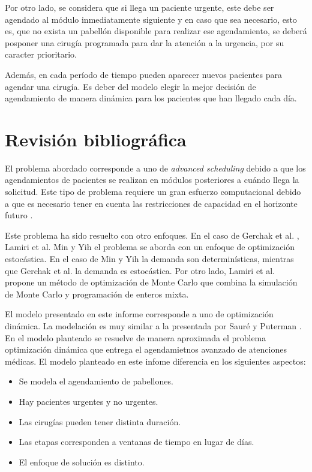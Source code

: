 \documentclass[letterpaper,10pt]{article}
\begin{document}
Por otro lado, se considera que si llega un paciente urgente, este debe ser agendado al módulo inmediatamente siguiente y en caso que sea necesario, esto es, que no exista un pabellón disponible para realizar ese agendamiento, se deberá posponer una cirugía programada para dar la atención a la urgencia, por su caracter prioritario.


Además, en cada período de tiempo pueden aparecer nuevos pacientes para agendar una cirugía. Es deber del modelo elegir la mejor decisión de agendamiento de manera dinámica para los pacientes que han llegado cada día.

\section*{Revisión bibliográfica}

El problema abordado corresponde a uno de 
\textit{advanced scheduling} debido a que los agendamientos de pacientes se realizan en módulos posteriores a cuándo llega la solicitud. Este tipo de problema requiere un gran esfuerzo computacional debido a que es necesario tener en cuenta las restricciones de capacidad en el horizonte futuro \cite{Yasin}.

Este problema ha sido resuelto con otro enfoques. En el caso de Gerchak et al. \cite{Gerchak}, Lamiri et al. \cite{Lamiri} Min y Yih \cite{Min} el problema se aborda con un enfoque de optimización estocástica. En el caso de Min y Yih \cite{Min} la demanda son determinísticas, mientras que Gerchak et al. la demanda es estocástica. Por otro lado, Lamiri et al. propone un método de optimización de Monte Carlo que combina la simulación de Monte Carlo y programación de enteros mixta. 

El modelo presentado en este informe corresponde a uno de optimización dinámica. La modelación es muy similar a la presentada por Sauré y Puterman \cite{saure17}. En el modelo planteado se resuelve de manera aproximada el problema optimización dinámica que entrega el agendamietnos avanzado de atenciones médicas. El modelo planteado en este infome diferencia en los siguientes aspectos:
\begin{itemize}
    \item Se modela el agendamiento de pabellones.
    \item Hay pacientes urgentes y no urgentes.
    \item Las cirugías pueden tener distinta duración.
    \item Las etapas corresponden a ventanas de tiempo en lugar de días.
    \item El enfoque de solución es distinto.
\end{itemize}
\end{document}
